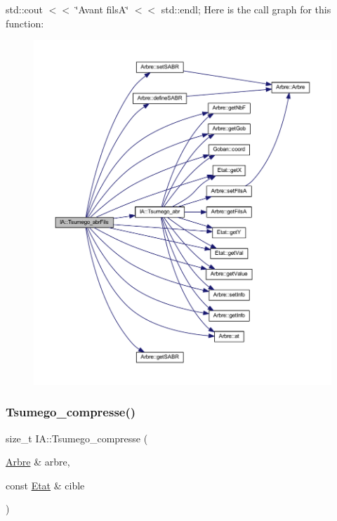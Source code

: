 std\+::cout $<$$<$ \char`\"{}\+Avant fils\+A\char`\"{} $<$$<$ std\+::endl; Here is the call graph for this function\+:
\nopagebreak
\begin{figure}[H]
\begin{center}
\leavevmode
\includegraphics[width=350pt]{class_i_a_a6f616b7d3d9d39eef4780b7a03226260_cgraph}
\end{center}
\end{figure}
\mbox{\label{class_i_a_a5d86a3548f2410f7fc0676b89d07f4fd}} 
\subsubsection{\texorpdfstring{Tsumego\+\_\+compresse()}{Tsumego\_compresse()}}
{\footnotesize\ttfamily size\+\_\+t I\+A\+::\+Tsumego\+\_\+compresse (\begin{DoxyParamCaption}\item[{\hyperlink{class_arbre}{Arbre} \&}]{arbre,  }\item[{const \hyperlink{class_etat}{Etat} \&}]{cible }\end{DoxyParamCaption})\hspace{0.3cm}{\ttfamily [static]}}

